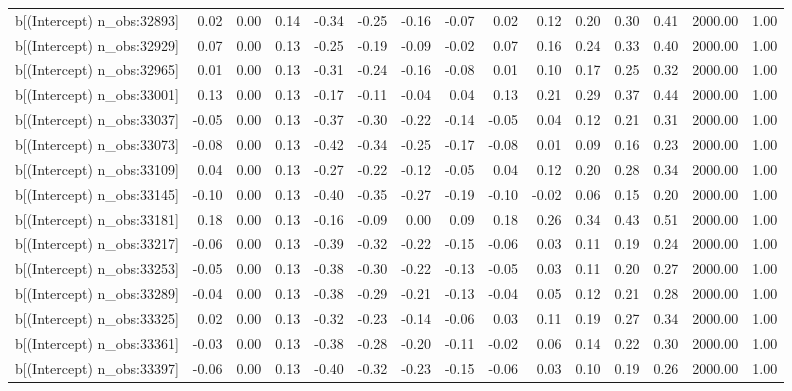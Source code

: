 \begin{table}[ht]
\begin{tabular}{rrrrrrrrrrrrrrr}
  b[(Intercept) n\_obs:32893] & 0.02 & 0.00 & 0.14 & -0.34 & -0.25 & -0.16 & -0.07 & 0.02 & 0.12 & 0.20 & 0.30 & 0.41 & 2000.00 & 1.00 \\ 
  b[(Intercept) n\_obs:32929] & 0.07 & 0.00 & 0.13 & -0.25 & -0.19 & -0.09 & -0.02 & 0.07 & 0.16 & 0.24 & 0.33 & 0.40 & 2000.00 & 1.00 \\ 
  b[(Intercept) n\_obs:32965] & 0.01 & 0.00 & 0.13 & -0.31 & -0.24 & -0.16 & -0.08 & 0.01 & 0.10 & 0.17 & 0.25 & 0.32 & 2000.00 & 1.00 \\ 
  b[(Intercept) n\_obs:33001] & 0.13 & 0.00 & 0.13 & -0.17 & -0.11 & -0.04 & 0.04 & 0.13 & 0.21 & 0.29 & 0.37 & 0.44 & 2000.00 & 1.00 \\ 
  b[(Intercept) n\_obs:33037] & -0.05 & 0.00 & 0.13 & -0.37 & -0.30 & -0.22 & -0.14 & -0.05 & 0.04 & 0.12 & 0.21 & 0.31 & 2000.00 & 1.00 \\ 
  b[(Intercept) n\_obs:33073] & -0.08 & 0.00 & 0.13 & -0.42 & -0.34 & -0.25 & -0.17 & -0.08 & 0.01 & 0.09 & 0.16 & 0.23 & 2000.00 & 1.00 \\ 
  b[(Intercept) n\_obs:33109] & 0.04 & 0.00 & 0.13 & -0.27 & -0.22 & -0.12 & -0.05 & 0.04 & 0.12 & 0.20 & 0.28 & 0.34 & 2000.00 & 1.00 \\ 
  b[(Intercept) n\_obs:33145] & -0.10 & 0.00 & 0.13 & -0.40 & -0.35 & -0.27 & -0.19 & -0.10 & -0.02 & 0.06 & 0.15 & 0.20 & 2000.00 & 1.00 \\ 
  b[(Intercept) n\_obs:33181] & 0.18 & 0.00 & 0.13 & -0.16 & -0.09 & 0.00 & 0.09 & 0.18 & 0.26 & 0.34 & 0.43 & 0.51 & 2000.00 & 1.00 \\ 
  b[(Intercept) n\_obs:33217] & -0.06 & 0.00 & 0.13 & -0.39 & -0.32 & -0.22 & -0.15 & -0.06 & 0.03 & 0.11 & 0.19 & 0.24 & 2000.00 & 1.00 \\ 
  b[(Intercept) n\_obs:33253] & -0.05 & 0.00 & 0.13 & -0.38 & -0.30 & -0.22 & -0.13 & -0.05 & 0.03 & 0.11 & 0.20 & 0.27 & 2000.00 & 1.00 \\ 
  b[(Intercept) n\_obs:33289] & -0.04 & 0.00 & 0.13 & -0.38 & -0.29 & -0.21 & -0.13 & -0.04 & 0.05 & 0.12 & 0.21 & 0.28 & 2000.00 & 1.00 \\ 
  b[(Intercept) n\_obs:33325] & 0.02 & 0.00 & 0.13 & -0.32 & -0.23 & -0.14 & -0.06 & 0.03 & 0.11 & 0.19 & 0.27 & 0.34 & 2000.00 & 1.00 \\ 
  b[(Intercept) n\_obs:33361] & -0.03 & 0.00 & 0.13 & -0.38 & -0.28 & -0.20 & -0.11 & -0.02 & 0.06 & 0.14 & 0.22 & 0.30 & 2000.00 & 1.00 \\ 
  b[(Intercept) n\_obs:33397] & -0.06 & 0.00 & 0.13 & -0.40 & -0.32 & -0.23 & -0.15 & -0.06 & 0.03 & 0.10 & 0.19 & 0.26 & 2000.00 & 1.00 \\ 

\end{tabular}
\end{table}
